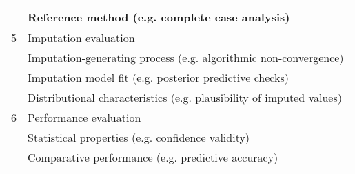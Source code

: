 \documentclass[bimj,fleqn]{w-art}
\begin{document}
\begin{table}[ht]
\begin{tabular}{ll}
  & Reference method (e.g. complete case analysis)                                    \\ \hline 
5 & Imputation evaluation                                                              \\ \cline{2-2}
  & Imputation-generating process (e.g. algorithmic non-convergence)                   \\
  & Imputation model fit (e.g. posterior predictive checks)                            \\
  & Distributional characteristics (e.g. plausibility of imputed values)               \\ \hline 
6 & Performance evaluation                                                             \\ \cline{2-2}
  & Statistical properties (e.g. confidence validity)                                  \\
  & Comparative performance (e.g. predictive accuracy)                                 \\ \hline
\end{tabular}
\end{table}





\end{document}
